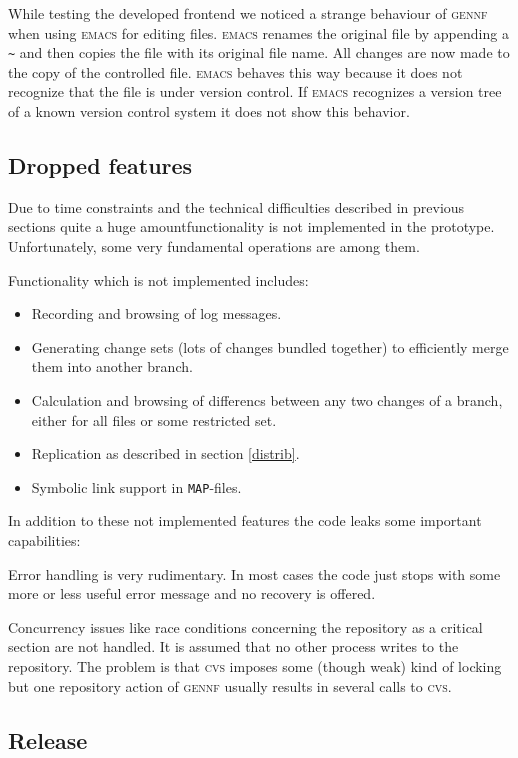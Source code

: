 \documentclass[fleqn, 10pt, a4paper]{report} \usepackage{amssymb}
\newcommand{\GENNF}{\textsc{gennf}}
\begin{document}
While testing the developed frontend we noticed a strange behaviour of
\GENNF{} when using \textsc{emacs} for editing files.  \textsc{emacs}
renames the original file by appending a \texttt{\textasciitilde} and
then copies the file with its original file name. All changes are now
made to the copy of the controlled file. \textsc{emacs} behaves this
way because it does not recognize that the file is under version
control. If \textsc{emacs} recognizes a version tree of a known
version control system it does not show this behavior.


\subsection{Dropped features}

Due to time constraints and the technical difficulties described in
previous sections quite a huge amountfunctionality is not implemented
in the prototype. Unfortunately, some very fundamental operations are
among them.

Functionality which is not implemented includes:

\begin{itemize}
\item Recording and browsing of log messages.
\item Generating change sets (lots of changes bundled together) to
  efficiently merge them into another branch.
\item Calculation and browsing of differencs between any two changes
  of a branch, either for all files or some restricted set.
\item Replication as described in section \ref{distrib}.
\item Symbolic link support in \texttt{MAP}-files.
\end{itemize}

In addition to these not implemented features the code leaks some
important capabilities:

Error handling is very rudimentary. In most cases the code just stops
with some more or less useful error message and no recovery is
offered.

Concurrency issues like race conditions concerning the repository as a
critical section are not handled. It is assumed that no other process
writes to the repository. The problem is that \textsc{cvs} imposes
some (though weak) kind of locking but one repository action of
\GENNF{} usually results in several calls to \textsc{cvs}.


\subsection{Release}
\end{document}
